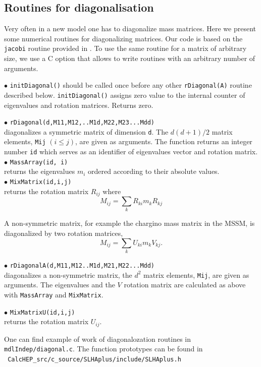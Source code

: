 \documentclass[12pt,a4paper]{article}
\begin{document}
\subsection{Routines for diagonalisation}

Very often in a new model  one has to diagonalize 
mass matrices. Here we present some numerical routines for 
diagonalizing matrices. Our code is based on the \verb|jacobi| routine provided in 
 \cite{Numerical}. To use the same routine for a matrix of arbitrary size, we 
use a C option that allows to write routines with an arbitrary number of arguments. 

\noindent 
$\bullet$ \verb|initDiagonal()| should be called once  before any other 
\verb|rDiagonal(A)| routine described below. \verb|initDiagonal()| assigns zero value 
to the internal counter of  eigenvalues and rotation matrices. Returns zero.

\noindent
$\bullet$ \verb|rDiagonal(d,M11,M12,..M1d,M22,M23...Mdd)|\\
diagonalizes a symmetric matrix of dimension \verb|d|. The  
$d(d+1)/2$  matrix elements, \verb|Mij| $(i\le j)$, are given as arguments.
The function returns an integer number \verb|id| which serves as an  identifier 
of eigenvalues vector and rotation matrix.\\
\noindent
$\bullet$ \verb|MassArray(id, i)|\\ returns the eigenvalues  $m_i$ ordered according to 
their absolute values. \\
\noindent
$\bullet$ \verb|MixMatrix(id,i,j)|\\ returns the rotation matrix  $R_{ij}$ where
$$  M_{ij} = \sum\limits_k  R_{ki} m_k R_{kj}$$

A non-symmetric matrix, for example the 
chargino mass matrix in the  MSSM, is diagonalized by  two rotation matrices,
$$  M_{ij} = \sum\limits_k  U_{ki} m_k V_{kj}.$$ 

\noindent
$\bullet$ \verb|rDiagonalA(d,M11,M12..M1d,M21,M22...Mdd)|\\ 
diagonalizes a non-symmetric matrix, the $d^2$  matrix elements, \verb|Mij|, are given as arguments.
The eigenvalues and the $V$ rotation matrix are calculated as above with 
\verb|MassArray| and \verb|MixMatrix|. 

\noindent
$\bullet$ \verb|MixMatrixU(id,i,j)|\\
returns the rotation matrix $U_{ij}$.

One can find example of work of diagonalozation routines in {\tt mdlIndep/diagonal.c}.
The function prototypes can be found in \\
\noindent
\verb| CalcHEP_src/c_source/SLHAplus/include/SLHAplus.h|
\end{document}
